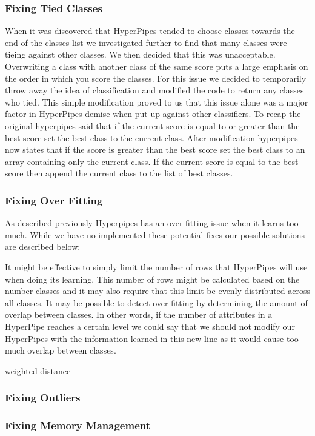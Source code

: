 \subsubsection{Fixing Tied Classes}
When it was discovered that HyperPipes tended to choose classes 
towards the end of the classes list we investigated further to 
find that many classes were tieing against other classes. We 
then decided that this was unacceptable. Overwriting a class 
with another class of the same score puts a large emphasis on 
the order in which you score the classes. For this issue we 
decided to temporarily throw away the idea of classification 
and modified the code to return any classes who tied. This 
simple modification proved to us that this issue alone was a 
major factor in HyperPipes demise when put up against other 
classifiers. To recap the original hyperpipes said that if 
the current score is equal to or greater than the best score 
set the best class to the current class. After modification 
hyperpipes now states that if the score is greater than the 
best score set the best class to an array containing only the 
current class. If the current score is equal to the best score 
then append the current class to the list of best classes.
\subsubsection{Fixing Over Fitting}
As described previously Hyperpipes has an over fitting issue 
when it learns too much. While we have no implemented these 
potential fixes our possible solutions are described below:

	It might be effective to simply limit the number of rows 
	that HyperPipes will use when doing its learning. This 
	number of rows might be calculated based on the number 
	classes and it may also require that this limit be 
	evenly distributed across all classes.
	It may be possible to detect over-fitting by determining 
	the amount of overlap between classes. In other words, 
	if the number of attributes in a HyperPipe reaches a 
	certain level we could say that we should not modify our 
	HyperPipes with the information learned in this new line
	as it would cause too much overlap between classes.
\item{weighted distance}
\subsubsection{Fixing Outliers}
\subsubsection{Fixing Memory Management}
